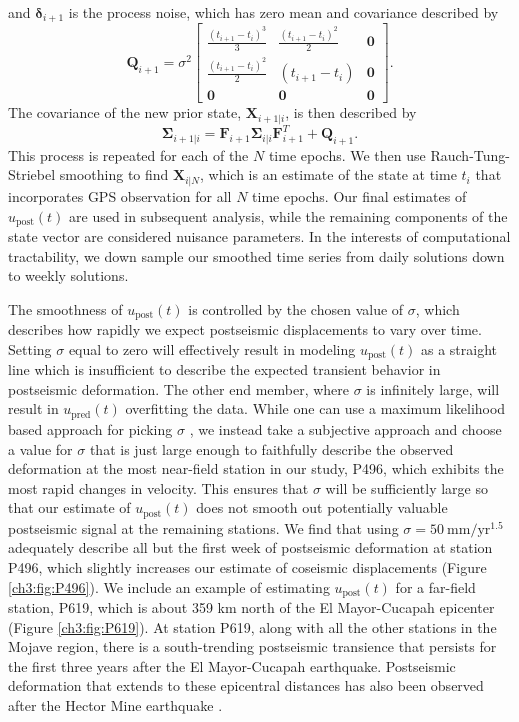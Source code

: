and $\mathbf{\delta}_{i+1}$ is the process noise, which has zero mean and covariance described by
\begin{equation}
  \mathbf{Q}_{i+1} = 
  \sigma^2 \left[
  \begin{array}{ccc}
  \frac{(t_{i+1} - t_i)^3}{3} & \frac{(t_{i+1} - t_{i})^2}{2} & \mathbf{0}\\
  \frac{(t_{i+1} - t_i)^2}{2} & (t_{i+1} - t_{i}) & \mathbf{0}\\ 
  \mathbf{0} & \mathbf{0} & \mathbf{0}
  \end{array}
  \right].
\end{equation}
The covariance of the new prior state, $\mathbf{X}_{i+1|i}$, is then described by
\begin{equation}
  \mathbf{\Sigma}_{i+1|i} = \mathbf{F}_{i+1}\mathbf{\Sigma}_{i|i}\mathbf{F}^T_{i+1} + \mathbf{Q}_{i+1}.
\end{equation}
This process is repeated for each of the $N$ time epochs.  We then use Rauch-Tung-Striebel smoothing \citep{Rauch1965} to find $\mathbf{X}_{i|N}$, which is an estimate of the state at time $t_i$ that incorporates GPS observation for all $N$ time epochs.  Our final estimates of $u_\mathrm{post}(t)$ are used in subsequent analysis, while the remaining components of the state vector are considered nuisance parameters. In the interests of computational tractability, we down sample our smoothed time series from daily solutions down to weekly solutions.

The smoothness of $u_\mathrm{post}(t)$ is controlled by the chosen value of $\sigma$, which describes how rapidly we expect postseismic displacements to vary over time.  Setting $\sigma$ equal to zero will effectively result in modeling $u_\mathrm{post}(t)$ as a straight line which is insufficient to describe the expected transient behavior in postseismic deformation. The other end member, where $\sigma$ is infinitely large, will result in $u_\mathrm{pred}(t)$ overfitting the data. While one can use a maximum likelihood based approach for picking $\sigma$ \citep[e.g.][]{Segall1997}, we instead take a subjective approach and choose a value for $\sigma$ that is just large enough to faithfully describe the observed deformation at the most near-field station in our study, P496, which exhibits the most rapid changes in velocity. This ensures that $\sigma$ will be sufficiently large so that our estimate of $u_\mathrm{post}(t)$ does not smooth out potentially valuable postseismic signal at the remaining stations. We find that using $\sigma = 50\  \mathrm{mm}/\mathrm{yr}^{1.5}$ adequately describe all but the first week of postseismic deformation at station P496, which slightly increases our estimate of coseismic displacements (Figure \ref{ch3:fig:P496}).  We include an example of estimating $u_\mathrm{post}(t)$ for a far-field station, P619, which is about 359 km north of the El Mayor-Cucapah epicenter (Figure \ref{ch3:fig:P619}).  At station P619, along with all the other stations in the Mojave region, there is a south-trending postseismic transience that persists for the first three years after the El Mayor-Cucapah earthquake.  Postseismic deformation that extends to these epicentral distances has also been observed after the Hector Mine earthquake \citep{Freed2007a}.

